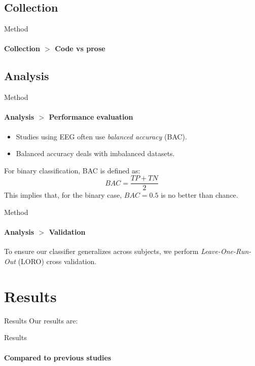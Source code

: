 \documentclass[xcolor={dvipsnames,table}]{beamer}
\begin{document}
\subsection{Collection}
\begin{frame}{Method}
    \framesubtitle{Collection $>$ Code vs prose}
    {
        \small
        
    }
\end{frame}

\subsection{Analysis}
\begin{frame}{Method}
    \framesubtitle{Analysis $>$ Performance evaluation}
    \begin{itemize}
        \item Studies using EEG often use \emph{balanced accuracy} (BAC).
        \item Balanced accuracy deals with imbalanced datasets.
    \end{itemize}

    \vspace{2em}

    For binary classification, BAC is defined as:
    $$BAC = \frac{TP + TN}{2}$$
    This implies that, for the binary case, $BAC = 0.5$ is no better than chance.
\end{frame}

\begin{frame}{Method}
    \framesubtitle{Analysis $>$ Validation}
    To ensure our classifier generalizes across subjects, we perform \emph{Leave-One-Run-Out} (LORO) cross validation.
    \vspace{1em}
    
\end{frame}

\section{Results}
\begin{frame}{Results}
    Our results are:
    {
        \small
        
    }
\end{frame}

\begin{frame}{Results}
    \framesubtitle{Compared to previous studies}
    \
    {
        \small
        
    }
\end{frame}
\end{document}
